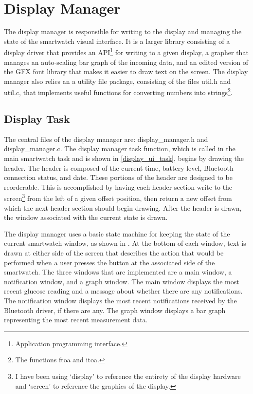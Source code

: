 \nl

\section{Display Manager}
The display manager is responsible for writing to the display and managing the state of the smartwatch visual interface. It is a larger library consisting of a display driver that provides an API\footnote{Application programming interface.} for writing to a given display, a grapher that manages an auto-scaling bar graph of the incoming data, and an edited version of the GFX font library\cite{gfxfont} that makes it easier to draw text on the screen. The display manager also relies an a utility file package, consisting of the files util.h and util.c, that implements useful functions for converting numbers into strings\footnote{The functions ftoa\cite{ftoa} and itoa\cite{itoa}.}.

\subsection{Display Task}
The central files of the display manager are: display\_manager.h and display\_manager.c. The display manager task function, which is called in the main smartwatch task and is shown in \ref{display_ui_task}, begins by drawing the header. The header is composed of the current time, battery level, Bluetooth connection status, and date. These portions of the header are designed to be reorderable. This is accomplished by having each header section write to the screen\footnote{I have been using `display' to reference the entirety of the display hardware and `screen' to reference the graphics of the display.} from the left of a given offset position, then return a new offset from which the next header section should begin drawing. After the header is drawn, the window associated with the current state is drawn.

The display manager uses a basic state machine for keeping the state of the current smartwatch window, as shown in . At the bottom of each window, text is drawn at either side of the screen that describes the action that would be performed when a user presses the button at the associated side of the smartwatch. The three windows that are implemented are a main window, a notification window, and a graph window. The main window displays the most recent glucose reading and a message about whether there are any notifications. The notification window displays the most recent notifications received by the Bluetooth driver, if there are any. The graph window displays a bar graph representing the most recent measurement data.


